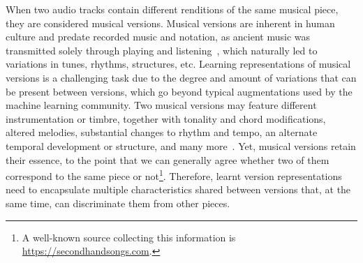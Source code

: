 When two audio tracks contain different renditions of the same musical piece, they are considered musical versions\footnotemark{}. %
Musical versions are inherent in human culture and predate recorded music and notation, as ancient music was transmitted solely through playing and listening~\cite{ball_music_2010}, which naturally led to variations in tunes, rhythms, structures, etc. 
Learning representations of musical versions is a challenging task due to the degree and amount of variations that can be present between versions, which go beyond typical augmentations used by the machine learning community. Two musical versions may feature different instrumentation or timbre, together with tonality and chord modifications, altered melodies, substantial changes to rhythm and tempo, an alternate temporal development or structure, and many more~\cite{yesiler_audio-based_2021}. Yet, musical versions retain their essence, to the point that we can generally agree whether two of them correspond to the same piece or not\footnote{A well-known source collecting this information is \url{https://secondhandsongs.com}.}. %
Therefore, learnt version representations need to encapsulate multiple characteristics shared between versions that, at the same time, can discriminate them from other pieces.

